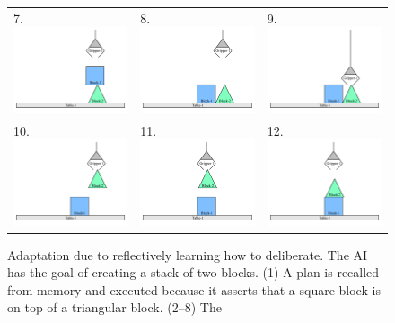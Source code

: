 \begin{figure}
\begin{tabular}{p{3.5cm}p{3.5cm}p{3.5cm}}
7. \includegraphics[width=3.5cm]{gfx/blocks_world_example-7}  & 8. \includegraphics[width=3.5cm]{gfx/blocks_world_example-8}  & 9. \includegraphics[width=3.5cm]{gfx/blocks_world_example-9} \\
10. \includegraphics[width=3.5cm]{gfx/blocks_world_example-10} & 11. \includegraphics[width=3.5cm]{gfx/blocks_world_example-11} & 12. \includegraphics[width=3.5cm]{gfx/blocks_world_example-12}
\end{tabular}
\caption[Adaptation due to reflectively learning how to
  deliberate.]{Adaptation due to reflectively learning how to
  deliberate.  The AI has the goal of creating a stack of two blocks.
  (1) A plan is recalled from memory and executed because it asserts
  that a square block is on top of a triangular block.  (2--8) The
}
\end{figure}
